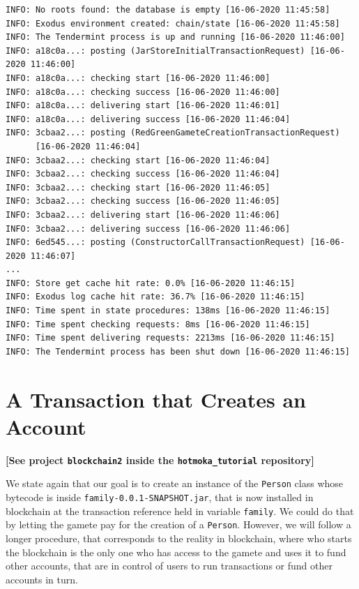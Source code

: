 \documentclass[a4paper,]{book}
\begin{document}
{\begin{myverbatim}
\begin{verbatim}
INFO: No roots found: the database is empty [16-06-2020 11:45:58]
INFO: Exodus environment created: chain/state [16-06-2020 11:45:58]
INFO: The Tendermint process is up and running [16-06-2020 11:46:00]
INFO: a18c0a...: posting (JarStoreInitialTransactionRequest) [16-06-2020 11:46:00]
INFO: a18c0a...: checking start [16-06-2020 11:46:00]
INFO: a18c0a...: checking success [16-06-2020 11:46:00]
INFO: a18c0a...: delivering start [16-06-2020 11:46:01]
INFO: a18c0a...: delivering success [16-06-2020 11:46:04]
INFO: 3cbaa2...: posting (RedGreenGameteCreationTransactionRequest)
      [16-06-2020 11:46:04]
INFO: 3cbaa2...: checking start [16-06-2020 11:46:04]
INFO: 3cbaa2...: checking success [16-06-2020 11:46:04]
INFO: 3cbaa2...: checking start [16-06-2020 11:46:05]
INFO: 3cbaa2...: checking success [16-06-2020 11:46:05]
INFO: 3cbaa2...: delivering start [16-06-2020 11:46:06]
INFO: 3cbaa2...: delivering success [16-06-2020 11:46:06]
INFO: 6ed545...: posting (ConstructorCallTransactionRequest) [16-06-2020 11:46:07]
...
INFO: Store get cache hit rate: 0.0% [16-06-2020 11:46:15]
INFO: Exodus log cache hit rate: 36.7% [16-06-2020 11:46:15]
INFO: Time spent in state procedures: 138ms [16-06-2020 11:46:15]
INFO: Time spent checking requests: 8ms [16-06-2020 11:46:15]
INFO: Time spent delivering requests: 2213ms [16-06-2020 11:46:15]
INFO: The Tendermint process has been shut down [16-06-2020 11:46:15]
\end{verbatim}
\end{myverbatim}

\hypertarget{a-transaction-that-creates-an-account}{%
\section{A Transaction that Creates an Account
}\label{a-transaction-that-creates-an-account}}

\textbf{{[}See project \texttt{blockchain2} inside the
\texttt{hotmoka\_tutorial} repository{]}}

We state again that our goal is to create an instance of the
\texttt{Person} class whose bytecode is inside
\texttt{family-0.0.1-SNAPSHOT.jar}, that is now installed in blockchain
at the transaction reference held in variable \texttt{family}. We could
do that by letting the gamete pay for the creation of a \texttt{Person}.
However, we will follow a longer procedure, that corresponds to the
reality in blockchain, where who starts the blockchain is the only one
who has access to the gamete and uses it to fund other accounts, that
are in control of users to run transactions or fund other accounts in
turn.

}
\end{document}

